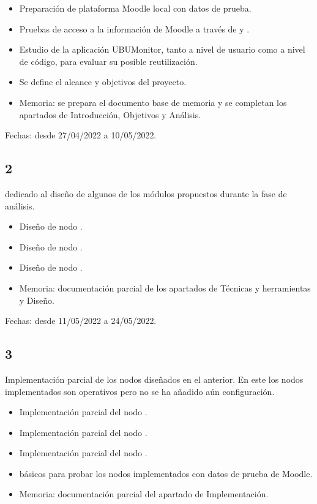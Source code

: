 \begin{itemize}
	\item Preparación de plataforma Moodle local con datos de prueba. 
	\item Pruebas de acceso a la información de Moodle a través de  y . 
    \item Estudio de la aplicación UBUMonitor, tanto a nivel de usuario como a nivel de código, para evaluar su posible reutilización.
    \item Se define el alcance y objetivos del proyecto.
    \item Memoria: se prepara el documento base de memoria y se completan los apartados de Introducción, Objetivos y Análisis. 
\end{itemize}

Fechas: desde 27/04/2022 a 10/05/2022.

\subsection{ 2}

 dedicado al diseño de algunos de los módulos propuestos durante la fase de análisis. 

\begin{itemize}
	\item Diseño de nodo .
	\item Diseño de nodo .
	\item Diseño de nodo .
	\item Memoria: documentación parcial de los apartados de Técnicas y herramientas y Diseño.
\end{itemize}

Fechas: desde 11/05/2022 a 24/05/2022.

\subsection{ 3}

Implementación parcial de los nodos diseñados en el  anterior. En este  los nodos implementados son operativos 
pero no se ha añadido aún configuración. 

\begin{itemize}
	\item Implementación parcial del nodo .
	\item Implementación parcial del nodo .
	\item Implementación parcial del nodo .
	\item {} básicos para probar los nodos implementados con datos de prueba de Moodle. 
	\item Memoria: documentación parcial del apartado de Implementación.
\end{itemize}

